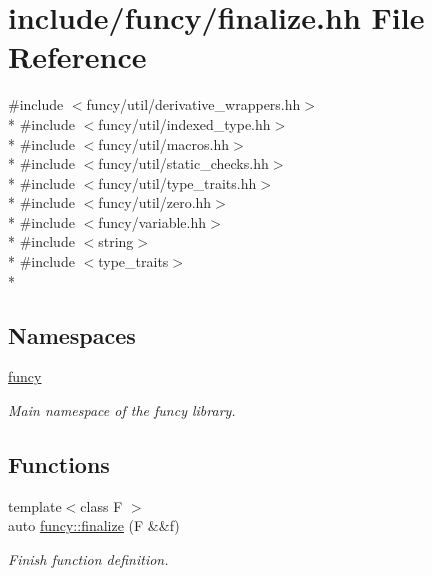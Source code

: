 \hypertarget{finalize_8hh}{\section{include/funcy/finalize.hh File Reference}
\label{finalize_8hh}
}
{\ttfamily \#include $<$funcy/util/derivative\-\_\-wrappers.\-hh$>$}\\*
{\ttfamily \#include $<$funcy/util/indexed\-\_\-type.\-hh$>$}\\*
{\ttfamily \#include $<$funcy/util/macros.\-hh$>$}\\*
{\ttfamily \#include $<$funcy/util/static\-\_\-checks.\-hh$>$}\\*
{\ttfamily \#include $<$funcy/util/type\-\_\-traits.\-hh$>$}\\*
{\ttfamily \#include $<$funcy/util/zero.\-hh$>$}\\*
{\ttfamily \#include $<$funcy/variable.\-hh$>$}\\*
{\ttfamily \#include $<$string$>$}\\*
{\ttfamily \#include $<$type\-\_\-traits$>$}\\*
\subsection*{Namespaces}
\begin{DoxyCompactItemize}
\item 
\hyperlink{namespacefuncy}{funcy}
\begin{DoxyCompactList}\small\item\em Main namespace of the funcy library. \end{DoxyCompactList}\end{DoxyCompactItemize}
\subsection*{Functions}
\begin{DoxyCompactItemize}
\item 
{\footnotesize template$<$class F $>$ }\\auto \hyperlink{namespacefuncy_a6e18ee3ccfed0acfdb6d17247a060bb3}{funcy\-::finalize} (F \&\&f)
\begin{DoxyCompactList}\small\item\em Finish function definition. \end{DoxyCompactList}\end{DoxyCompactItemize}
